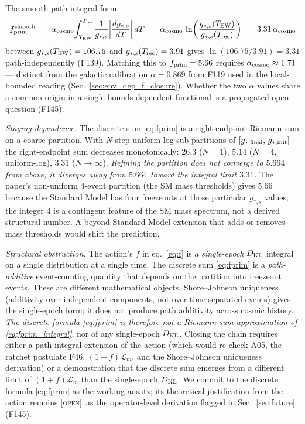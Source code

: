 \documentclass[aps,prd,twocolumn,nofootinbib,floatfix,superscriptaddress]{revtex4-2}
\newcommand{\OPEN}{{\color{black!60!red}\textsc{[open]}}}
\newcommand{\fprim}{f_{\rm prim}}
\begin{document}
The smooth path-integral form
\begin{equation}
\label{eq:fprim_integral}
\fprim^{\rm smooth} \;=\; \alpha_{\rm cosmo}\!\int_{T_{\rm EW}}^{T_{\rm rec}}\!\frac{1}{g_{*,s}}\bigg|\frac{dg_{*,s}}{dT}\bigg|\,dT
\;=\; \alpha_{\rm cosmo}\,\ln\!\bigg(\frac{g_{*,s}(T_{\rm EW})}{g_{*,s}(T_{\rm rec})}\bigg)
\;=\; 3.31\,\alpha_{\rm cosmo}
\end{equation}
between $g_{*,s}(T_{\rm EW}) = 106.75$ and $g_{*,s}(T_{\rm rec}) = 3.91$
gives $\ln(106.75/3.91) = 3.31$ path-independently (F139). Matching
this to $\fprim = 5.66$ requires $\alpha_{\rm cosmo} \approx 1.71$
--- distinct from the galactic calibration $\alpha = 0.869$ from
F119 used in the local-bounded reading
(Sec.~\ref{sec:env_dep_f_closure}). Whether the two $\alpha$ values
share a common origin in a single bounds-dependent functional is a
propagated open question (F145).

\emph{Staging dependence.} The discrete sum \eqref{eq:fprim} is a
right-endpoint Riemann sum on a coarse partition. With $N$-step
uniform-log sub-partitions of $[g_{*,{\rm final}},\,g_{*,{\rm init}}]$
the right-endpoint sum decreases monotonically: $26.3$ ($N{=}1$),
$5.14$ ($N{=}4$, uniform-log), $3.31$ ($N\to\infty$). \emph{Refining
the partition does not converge to $5.664$ from above; it diverges
away from $5.664$ toward the integral limit $3.31$.} The paper's
non-uniform 4-event partition (the SM mass thresholds) gives $5.66$
because the Standard Model has four freezeouts at those particular
$g_{*,s}$ values; the integer $4$ is a contingent feature of the SM
mass spectrum, not a derived structural number. A
beyond-Standard-Model extension that adds or removes mass thresholds
would shift the prediction.

\emph{Structural obstruction.} The action's $f$ in eq.~\ref{eq:f} is
a \emph{single-epoch} $D_{\rm KL}$ integral on a single distribution
at a single time. The discrete sum \eqref{eq:fprim} is a
\emph{path-additive} event-counting quantity that depends on the
partition into freezeout events. These are different mathematical
objects. Shore--Johnson uniqueness (additivity over independent
components, not over time-separated events) gives the single-epoch
form; it does not produce path additivity across cosmic history.
\emph{The discrete formula \eqref{eq:fprim} is therefore not a
Riemann-sum approximation of \eqref{eq:fprim_integral}}, nor of any
single-epoch $D_{\rm KL}$. Closing the chain requires either a
path-integral extension of the action (which would re-check A05,
the ratchet postulate F46, $(1{+}f)\mathcal L_m$, and the
Shore--Johnson uniqueness derivation) or a demonstration that the
discrete sum emerges from a different limit of $(1{+}f)\mathcal L_m$
than the single-epoch $D_{\rm KL}$. We commit to the discrete
formula \eqref{eq:fprim} as the working ansatz; its theoretical
justification from the action remains \OPEN\ as the operator-level
derivation flagged in Sec.~\ref{sec:future} (F145).
\end{document}
